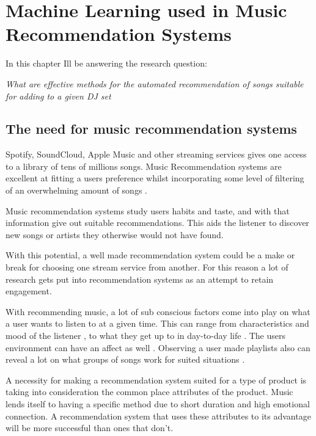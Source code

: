 
\graphicspath{{Chapter2/}}

\chapter{Machine Learning used in Music Recommendation Systems}

In this chapter Ill be answering the research question:

\textit{What are effective methods for the automated recommendation of songs suitable for adding to a given DJ set} 

\section{The need for music recommendation systems}
Spotify, SoundCloud, Apple Music and other streaming services gives one access to a library of tens of millions songs. Music Recommendation systems are excellent at fitting a users preference whilst incorporating some level of filtering of an overwhelming amount of songs \citep{bollen_understanding_2010}. 

Music recommendation systems study users habits and taste, and with that information give out suitable recommendations. This aids the listener to discover new songs or artists they otherwise would not have found.

With this potential, a well made recommendation system could be a make or break for choosing one stream service from another. For this reason a lot of research gets put into recommendation systems as an attempt to retain engagement. 

 With recommending music, a lot of sub conscious factors come into play on what a user wants to listen to at a given time. This can range from characteristics and mood of the listener \citep{ferwerda_personality_2015}  \citep{rentfrow_re_2003}, to what they get up to in day-to-day life \citep{gillhofer_iron_2015} \citep{wang_context-aware_2012}.  The users environment can have an affect as well \citep{kaminskas_location-aware_2013}. Observing a user made playlists also can reveal a lot on what groups of songs work for suited situations \citep{zheleva_statistical_2010} \citep{mcfee_hypergraph_2012}.
 
 A necessity for making a recommendation system suited for a type of product is taking into consideration the common place attributes of the product. Music lends itself to having a specific method due to short duration and high emotional connection. A recommendation system that uses these attributes to its advantage will be more successful than ones that don't.

